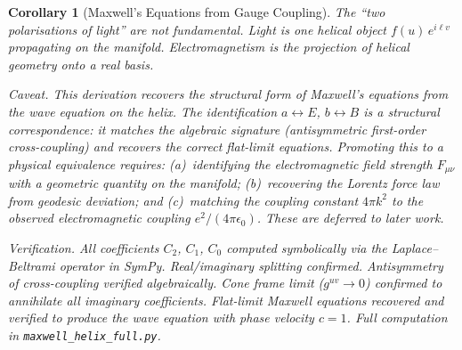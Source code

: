 \documentclass[12pt]{amsart}
\newtheorem{corollary}{Corollary}
\begin{document}
\begin{corollary}[Maxwell's Equations from Gauge Coupling]
The ``two polarisations of light'' are not fundamental. Light is one helical object
$f(u)\, e^{i\ell v}$ propagating on the manifold. Electromagnetism is the projection of helical
geometry onto a real basis.

\textit{Caveat.} This derivation recovers the structural form of Maxwell's equations from the
wave equation on the helix. The identification $a \leftrightarrow E$, $b \leftrightarrow B$ is
a structural correspondence: it matches the algebraic signature (antisymmetric first-order
cross-coupling) and recovers the correct flat-limit equations. Promoting this to a physical
equivalence requires: (a)~identifying the electromagnetic field strength $F_{\mu\nu}$ with a
geometric quantity on the manifold; (b)~recovering the Lorentz force law from geodesic deviation;
and (c)~matching the coupling constant $4\pi k^2$ to the observed electromagnetic coupling
$e^2/(4\pi\epsilon_0)$. These are deferred to later work.

\textit{Verification.} All coefficients $C_2$, $C_1$, $C_0$ computed symbolically via the
Laplace--Beltrami operator in SymPy. Real/imaginary splitting confirmed. Antisymmetry of
cross-coupling verified algebraically. Cone frame limit ($g^{uv} \to 0$) confirmed to
annihilate all imaginary coefficients. Flat-limit Maxwell equations recovered and verified to
produce the wave equation with phase velocity $c = 1$. Full computation in
\texttt{maxwell\_helix\_full.py}.
\end{corollary}

\end{document}
